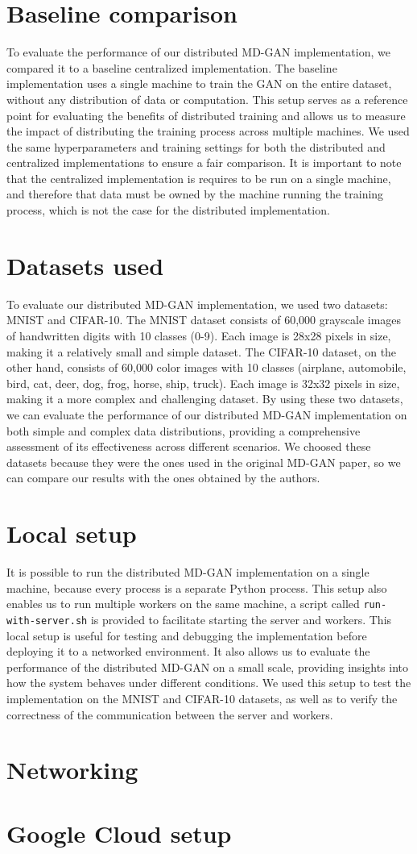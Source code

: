 \section{Baseline comparison}
To evaluate the performance of our distributed MD-GAN implementation, we compared it to a baseline centralized implementation. The baseline implementation uses a single machine to train the GAN on the entire dataset, without any distribution of data or computation. This setup serves as a reference point for evaluating the benefits of distributed training and allows us to measure the impact of distributing the training process across multiple machines. We used the same hyperparameters and training settings for both the distributed and centralized implementations to ensure a fair comparison. It is important to note that the centralized implementation is requires to be run on a single machine, and therefore that data must be owned by the machine running the training process, which is not the case for the distributed implementation.

\section{Datasets used}
To evaluate our distributed MD-GAN implementation, we used two datasets: MNIST and CIFAR-10. The MNIST dataset consists of 60,000 grayscale images of handwritten digits with 10 classes (0-9). Each image is 28x28 pixels in size, making it a relatively small and simple dataset. The CIFAR-10 dataset, on the other hand, consists of 60,000 color images with 10 classes (airplane, automobile, bird, cat, deer, dog, frog, horse, ship, truck). Each image is 32x32 pixels in size, making it a more complex and challenging dataset. By using these two datasets, we can evaluate the performance of our distributed MD-GAN implementation on both simple and complex data distributions, providing a comprehensive assessment of its effectiveness across different scenarios. We choosed these datasets because they were the ones used in the original MD-GAN paper, so we can compare our results with the ones obtained by the authors.

\section{Local setup}
It is possible to run the distributed MD-GAN implementation on a single machine, because every process is a separate Python process. This setup also enables us to run multiple workers on the same machine, a script called \texttt{run-with-server.sh} is provided to facilitate starting the server and workers. This local setup is useful for testing and debugging the implementation before deploying it to a networked environment. It also allows us to evaluate the performance of the distributed MD-GAN on a small scale, providing insights into how the system behaves under different conditions. We used this setup to test the implementation on the MNIST and CIFAR-10 datasets, as well as to verify the correctness of the communication between the server and workers.

\section{Networking}


\section{Google Cloud setup}